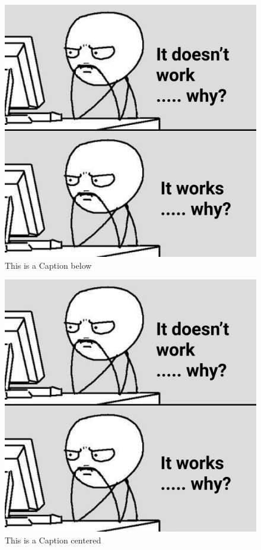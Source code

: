\documentclass[12pt]{article}
\begin{document}
\begin{figure}[H]
  \includegraphics[width=\textwidth]{img}
  \caption{This is a Caption below  \label{figure:cap-below}}
\end{figure}

\begin{figure}[H]
    \captionsetup{justification=centering}
    \includegraphics[width=.6\textwidth, center]{img}
    \caption{This is a Caption centered  \label{figure:cap-center}}
\end{figure}
\end{document}
